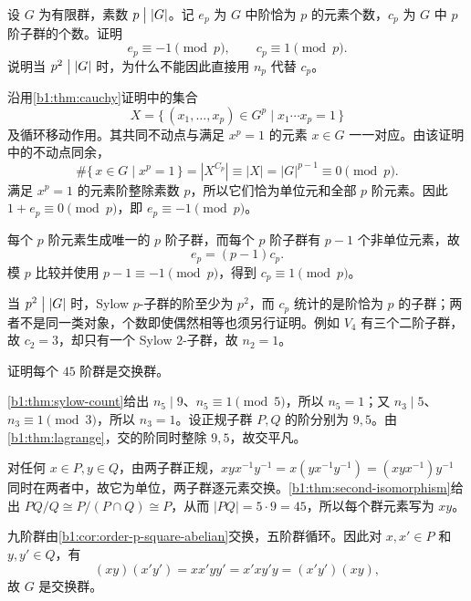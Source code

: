 \begin{exercise}\label{b1:ex:05-cauchy-count}
	设 \(G\) 为有限群，素数 \(p\bigm\vert|G|\)。记 \(e_p\) 为 \(G\) 中阶恰为 \(p\) 的元素个数，\(c_p\) 为 \(G\) 中 \(p\) 阶子群的个数。证明
	\[
		e_p\equiv-1\pmod p,\qquad c_p\equiv1\pmod p.
	\]
	说明当 \(p^2\bigm\vert|G|\) 时，为什么不能因此直接用 \(n_p\) 代替 \(c_p\)。
\end{exercise}
\begin{solution}
	沿用\cref{b1:thm:cauchy}证明中的集合
	\[
		X=\bigl\{\,(x_1,\ldots,x_p)\in G^p\mid x_1\cdots x_p=1\,\bigr\}
	\]
	及循环移动作用。其共同不动点与满足 \(x^p=1\) 的元素 \(x\in G\) 一一对应。由该证明中的不动点同余，
	\[
		\#\{\,x\in G\mid x^p=1\,\} =|X^{C_p}|\equiv|X|=|G|^{p-1}\equiv0\pmod p.
	\]
	满足 \(x^p=1\) 的元素阶整除素数 \(p\)，所以它们恰为单位元和全部 \(p\) 阶元素。因此 \(1+e_p\equiv0\pmod p\)，即 \(e_p\equiv-1\pmod p\)。

	每个 \(p\) 阶元素生成唯一的 \(p\) 阶子群，而每个 \(p\) 阶子群有 \(p-1\) 个非单位元素，故
	\[
		e_p=(p-1)c_p.
	\]
	模 \(p\) 比较并使用 \(p-1\equiv-1\pmod p\)，得到 \(c_p\equiv1\pmod p\)。

	当 \(p^2\bigm\vert|G|\) 时，Sylow \(p\)-子群的阶至少为 \(p^2\)，而 \(c_p\) 统计的是阶恰为 \(p\) 的子群；两者不是同一类对象，个数即使偶然相等也须另行证明。例如 \(V_4\) 有三个二阶子群，故 \(c_2=3\)，却只有一个 Sylow \(2\)-子群，故 \(n_2=1\)。
\end{solution}

\begin{exercise}\label{b1:ex:05-2}
	证明每个 \(45\) 阶群是交换群。
\end{exercise}
\begin{solution}
	\cref{b1:thm:sylow-count}给出 \(n_5\mid9\)、\(n_5\equiv1\pmod5\)，所以 \(n_5=1\)；又 \(n_3\mid5\)、\(n_3\equiv1\pmod3\)，所以 \(n_3=1\)。设正规子群 \(P,Q\) 的阶分别为 \(9,5\)。由\cref{b1:thm:lagrange}，交的阶同时整除 \(9,5\)，故交平凡。

	对任何 \(x\in P,y\in Q\)，由两子群正规，\(xyx^{-1}y^{-1}=x(yx^{-1}y^{-1})=(xyx^{-1})y^{-1}\) 同时在两者中，故它为单位，两子群逐元素交换。\cref{b1:thm:second-isomorphism}给出 \(PQ/Q\cong P/(P\cap Q)\cong P\)，从而 \(|PQ|=5\cdot9=45\)，所以每个群元素写为 \(xy\)。

	九阶群由\cref{b1:cor:order-p-square-abelian}交换，五阶群循环。因此对 \(x,x'\in P\) 和 \(y,y'\in Q\)，有
	\[
		(xy)(x'y')=xx'yy'=x'xy'y=(x'y')(xy),
	\]
	故 \(G\) 是交换群。
\end{solution}

